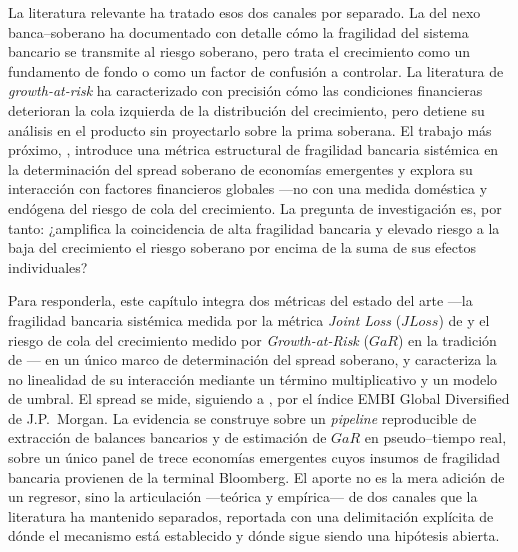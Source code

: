 La literatura relevante ha tratado esos dos canales por separado. La del nexo banca--soberano ha documentado con detalle cómo la fragilidad del sistema bancario se transmite al riesgo soberano, pero trata el crecimiento como un fundamento de fondo o como un factor de confusión a controlar. La literatura de \textit{growth-at-risk} ha caracterizado con precisión cómo las condiciones financieras deterioran la cola izquierda de la distribución del crecimiento, pero detiene su análisis en el producto sin proyectarlo sobre la prima soberana. El trabajo más próximo, \citet{Chari2024b}, introduce una métrica estructural de fragilidad bancaria sistémica en la determinación del spread soberano de economías emergentes y explora su interacción con factores financieros globales —no con una medida doméstica y endógena del riesgo de cola del crecimiento. La pregunta de investigación es, por tanto: ¿amplifica la coincidencia de alta fragilidad bancaria y elevado riesgo a la baja del crecimiento el riesgo soberano por encima de la suma de sus efectos individuales?

Para responderla, este capítulo integra dos métricas del estado del arte —la fragilidad bancaria sistémica medida por la métrica \textit{Joint Loss} ($JLoss$) de \citet{Chari2024b} y el riesgo de cola del crecimiento medido por \textit{Growth-at-Risk} ($GaR$) en la tradición de \citet{ABG2019b}— en un único marco de determinación del spread soberano, y caracteriza la no linealidad de su interacción mediante un término multiplicativo y un modelo de umbral. El spread se mide, siguiendo a \citet{Chari2024b}, por el índice EMBI Global Diversified de J.P.\ Morgan. La evidencia se construye sobre un \textit{pipeline} reproducible de extracción de balances bancarios y de estimación de $GaR$ en pseudo--tiempo real, sobre un único panel de trece economías emergentes cuyos insumos de fragilidad bancaria provienen de la terminal Bloomberg. El aporte no es la mera adición de un regresor, sino la articulación —teórica y empírica— de dos canales que la literatura ha mantenido separados, reportada con una delimitación explícita de dónde el mecanismo está establecido y dónde sigue siendo una hipótesis abierta.

